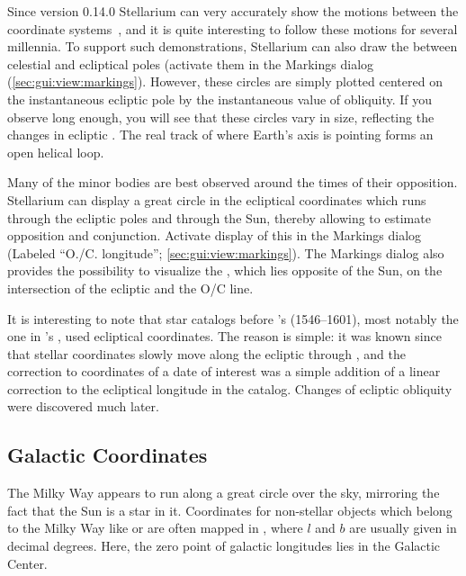 Since version 0.14.0 Stellarium can very accurately show the motions
between the coordinate systems~\citep{2011AA:Vondrak, 2012AA:Vondrak}, and it is quite
interesting to follow these motions for several millennia. To support
such demonstrations, Stellarium can also draw the
 between celestial and ecliptical poles
(activate them in the Markings dialog (\ref{sec:gui:view:markings}).
However, these circles are simply plotted centered on the instantaneous
ecliptic pole by the instantaneous value of obliquity. 
If you observe long enough, you will
see that these circles vary in size, reflecting the changes in
ecliptic . The real track of where Earth's axis is pointing forms an open helical loop.



Many of the minor bodies are best observed around the times of their
opposition.  Stellarium can display a great circle in the ecliptical
coordinates which runs through the ecliptic poles and through the Sun,
thereby allowing to estimate opposition and conjunction. Activate
display of this  in the Markings dialog
(Labeled ``O./C. longitude''; \ref{sec:gui:view:markings}). 
The Markings dialog also provides the possibility to visualize the , which lies opposite of the Sun, on the intersection of the ecliptic and the O/C line.



It is interesting to note that star catalogs before 's 
(1546--1601), most notably the one in 's
, used ecliptical coordinates. The reason is
simple: it was known since  that stellar coordinates
slowly move along the ecliptic through , and the
correction to coordinates of a date of interest was a simple addition
of a linear correction to the ecliptical longitude in the
catalog. Changes of ecliptic obliquity were discovered much later.

\subsection{Galactic Coordinates}
\label{sec:Concepts:Galactic}

The Milky Way appears to run along a great circle over the sky,
mirroring the fact that the Sun is a star in it. Coordinates for
non-stellar objects which belong to the Milky Way like
 or  are often mapped
in , 
where  $l$ and 
 $b$ are usually given in decimal
degrees. Here, the zero point of galactic longitudes lies in the
Galactic Center.

